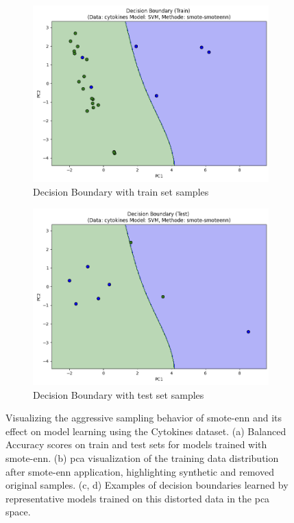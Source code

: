 \documentclass[12pt,a4paper]{report}
\begin{document}
\begin{figure}[h!]
    \begin{subfigure}[b]{0.48\textwidth}
        \centering
        \includegraphics[width=\textwidth]{images/smote_een_fig1c.png}
        \caption{Decision Boundary with train set samples}
        \label{fig:smote_enn_fig1c}
    \end{subfigure}
    \hfill
    \begin{subfigure}[b]{0.48\textwidth}
        \centering
        \includegraphics[width=\textwidth]{images/smote_een_fig1d.png}
        \caption{Decision Boundary with test set samples}
        \label{fig:smote_enn_fig1d}
    \end{subfigure}

    \caption[Visualizing \gls{smote}-\gls{enn} on Cytokines]{Visualizing the aggressive sampling behavior of \gls{smote}-\gls{enn} and its effect on model learning using the Cytokines dataset. (a) Balanced Accuracy scores on train and test sets for models trained with \gls{smote}-\gls{enn}. (b) \gls{pca} visualization of the training data distribution after \gls{smote}-\gls{enn} application, highlighting synthetic and removed original samples. (c, d) Examples of decision boundaries learned by representative models trained on this distorted data in the \gls{pca} space.}
    \label{fig:smote-enn-example-1}
\end{figure}
\end{document}
